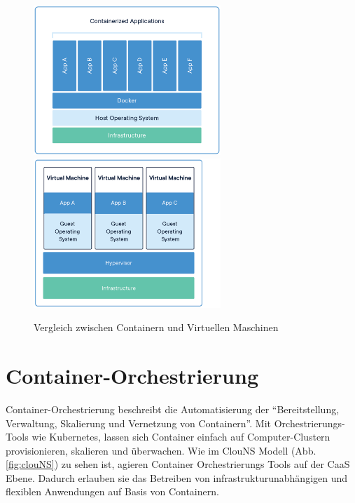 \begin{figure}[H]
    \includegraphics[width=200pt]{img/container-architecture.png}
    \includegraphics[width=200pt]{img/vm-architecture.png}
    
    \caption[Vergleich zwischen Containern und Virtuellen Maschinen]{Vergleich zwischen Containern und Virtuellen Maschinen\cite{noauthor_what_nodate}}
    \label{fig:containerVsVMs}
\end{figure}

\section{Container-Orchestrierung}
Container-Orchestrierung beschreibt die Automatisierung der "`Bereitstellung, Verwaltung, Skalierung und Vernetzung von Containern"'\cite{noauthor_was_nodate-1}. Mit Orchestrierungs-Tools wie Kubernetes, lassen sich Container einfach auf Computer-Clustern provisionieren, skalieren und überwachen. Wie im ClouNS Modell (Abb. \ref{fig:clouNS}) zu sehen ist, agieren Container Orchestrierungs Tools auf der CaaS Ebene. Dadurch erlauben sie das Betreiben von infrastrukturunabhängigen und flexiblen Anwendungen auf Basis von Containern\cite{noauthor_was_nodate}.

